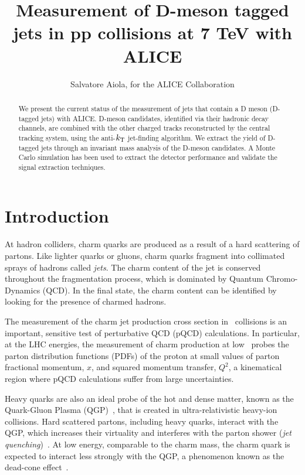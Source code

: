 \documentclass[a4paper]{jpconf}
\begin{document}
\title{Measurement of D-meson tagged jets in pp collisions at 7 TeV with ALICE}

\author{Salvatore Aiola, for the ALICE Collaboration}

\address{Physics Department, Yale University, 266 Whitney Avenue, New Haven, CT 06511}


\begin{abstract}
We present the current status of the measurement of jets that contain a D meson (D-tagged jets) with \mbox{ALICE}.
D-meson candidates, identified via their hadronic decay channels, are combined with the other charged tracks reconstructed by the central tracking system, 
using the anti-$k_{\rm T}$ jet-finding algorithm.
We extract the yield of D-tagged jets through an invariant mass analysis of the D-meson candidates.
A Monte Carlo simulation has been used to extract the detector performance and validate the signal extraction techniques.
\end{abstract}

\section{Introduction}
At hadron colliders, charm quarks are produced as a result of a hard scattering of partons. Like lighter quarks or gluons, charm quarks
fragment into collimated sprays of hadrons called \emph{jets}. The charm content of the jet is conserved throughout the fragmentation process,
which is dominated by Quantum Chromo-Dynamics (QCD).
In the final state, the charm content can be identified by looking for the presence of charmed hadrons.

The measurement of the charm jet production cross section in \pp\ collisions is an important, sensitive test of perturbative QCD (pQCD) calculations.
In particular, at the LHC energies, the measurement of charm production at low \pT\ probes the parton distribution functions (PDFs)
of the proton at small values of parton fractional momentum, $x$, and squared momentum transfer, $Q^2$, 
a kinematical region where pQCD calculations suffer from large uncertainties.

Heavy quarks are also an ideal probe of the hot and dense matter, 
known as the Quark-Gluon Plasma (QGP)~\cite{STAR:2005a, PHENIX:2005a}, 
that is created in ultra-relativistic heavy-ion collisions. 
Hard scattered partons, including heavy quarks, interact with the QGP, which increases their virtuality and interferes with the
parton shower (\emph{jet quenching})~\cite{PHENIX:2008b, CMS:2012b, ALICE:2015a}.
At low energy, comparable to the charm mass, the charm quark is expected
to interact less strongly with the QGP, a phenomenon known as the dead-cone effect~\cite{Dokshitzer:2001}.
\end{document}
